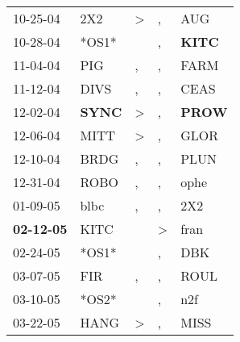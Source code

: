 \begin{supertabular}{p{0.07\textwidth}p{0.06\textwidth}p{0.02\textwidth}p{0.02\textwidth}p{0.06\textwidth}}
          10-25-04\textsuperscript{} &            2X2\textsuperscript{} &     \textgreater &                , &            AUG\textsuperscript{} \\
          10-28-04\textsuperscript{} &                            *OS1* &                  &                , &  \textbf{KITC\textsuperscript{}} \\
          11-04-04\textsuperscript{} &            PIG\textsuperscript{} &                , &                , &           FARM\textsuperscript{} \\
          11-12-04\textsuperscript{} &           DIVS\textsuperscript{} &                , &                , &           CEAS\textsuperscript{} \\
          12-02-04\textsuperscript{} &  \textbf{SYNC\textsuperscript{}} &     \textgreater &                , &  \textbf{PROW\textsuperscript{}} \\
          12-06-04\textsuperscript{} &           MITT\textsuperscript{} &     \textgreater &                , &           GLOR\textsuperscript{} \\
          12-10-04\textsuperscript{} &           BRDG\textsuperscript{} &                , &                , &           PLUN\textsuperscript{} \\
          12-31-04\textsuperscript{} &           ROBO\textsuperscript{} &                , &                , &           ophe\textsuperscript{} \\
          01-09-05\textsuperscript{} &           blbc\textsuperscript{} &                , &                , &            2X2\textsuperscript{} \\
 \textbf{02-12-05\textsuperscript{}} &           KITC\textsuperscript{} &                  &     \textgreater &           fran\textsuperscript{} \\
          02-24-05\textsuperscript{} &                            *OS1* &                  &                , &            DBK\textsuperscript{} \\
          03-07-05\textsuperscript{} &            FIR\textsuperscript{} &                , &                , &           ROUL\textsuperscript{} \\
          03-10-05\textsuperscript{} &                            *OS2* &                  &                , &            n2f\textsuperscript{} \\
          03-22-05\textsuperscript{} &           HANG\textsuperscript{} &     \textgreater &                , &           MISS\textsuperscript{} \\

\end{supertabular}
